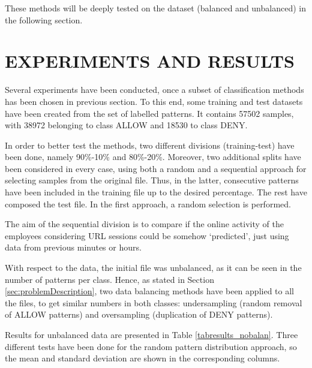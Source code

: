 \documentclass{llncs}
\begin{document}
These methods will be deeply tested on the dataset (balanced and unbalanced) in the following section.

%
\section{\uppercase{Experiments and Results}}
\label{sec:results}

\noindent Several experiments have been conducted, once a subset of classification methods has been chosen in previous section.
To this end, some training and test datasets have been created from
the set of labelled patterns. It contains 57502 samples, with 38972
belonging to class ALLOW and 18530 to class DENY.

In order to better test the methods, two different divisions (training-test) have been done, namely 90\%-10\% and 80\%-20\%. Moreover, two additional splits have been considered in every case, using both a random and a sequential approach for selecting samples from the original file. Thus, in the latter, consecutive patterns have been included in the training file up to the desired percentage. The rest have composed the test file. In the first approach, a random selection is performed.

The aim of the sequential division is to compare if the online activity of the employees considering URL sessions could be somehow `predicted', just using data from previous minutes or hours.

With respect to the data, the initial file was unbalanced, as it can be seen in the number of patterns per class. Hence, as stated in Section \ref{sec:problemDescription}, two data balancing methods have been applied to all the files, to get similar numbers in both classes: undersampling (random removal of ALLOW patterns) and oversampling (duplication of DENY patterns).

Results for unbalanced data are presented in Table \ref{tabresults_nobalan}.
Three different tests have been done for the random pattern distribution approach, so the mean and standard deviation are shown in the corresponding columns.
\end{document}
